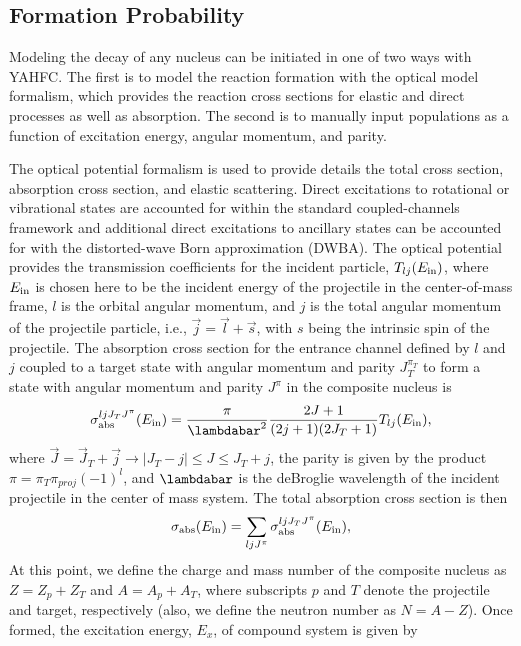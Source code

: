 \documentclass[
10pt,
showpacs,preprintnumbers,footinbib,
amsfonts,amsmath,amssymb,
aps,
prc,twocolumn,groupedaddress,superscriptaddress,
showkeys,
nofootinbib
]{revtex4-1}
\begin{document}
\subsection{Formation Probability}
Modeling the decay of any nucleus can be initiated in one of two ways with YAHFC. The first is to model the reaction formation with the optical model formalism, which provides the reaction cross sections for elastic and direct processes as well as absorption. The second is to manually input populations as a function of excitation energy, angular momentum, and parity.

The optical potential formalism is used to provide details the total cross section, absorption cross section, and elastic scattering. Direct excitations to rotational or vibrational states are accounted for within the standard coupled-channels framework and additional direct excitations to ancillary states can be accounted for with the distorted-wave Born approximation (DWBA). The optical potential provides the transmission coefficients for the incident particle, $T_{lj}(E_{\rm in})$, where $E_{\rm in}$ is chosen here to be the incident energy of the projectile in the center-of-mass frame, $l$ is the orbital angular momentum, and $j$ is the total angular momentum of the projectile particle, i.e., $\vec j = \vec l + \vec s$, with $s$ being the intrinsic spin of the projectile. The absorption cross section for the entrance channel defined by $l$ and $j$ coupled to a target state with angular momentum and parity $J_T^{\pi_T}$ to form a state with angular momentum and parity $J^\pi$ in the composite nucleus is
\begin{equation}
\sigma_{\rm abs}^{ljJ_TJ^\pi}(E_{\rm in}) = \frac{\pi}{\lambdabar^2} \frac{2J + 1}{(2j+1)(2J_T+1)}T_{lj}(E_{\rm in}),
\label{eq:abs_chan}
\end{equation}
where $\vec{J} = \vec{J}_T + \vec j \rightarrow |J_T-j| \le J \le J_T + j$, the parity is given by the product $\pi = \pi_T\pi_{proj}(-1)^l$, and $\lambdabar$ is the deBroglie wavelength of the incident projectile in the center of mass system. The total absorption cross section is then
\begin{equation} 
\sigma_{\rm abs} (E_{\rm in})= \sum_{ljJ^\pi} \sigma_{\rm abs}^{ljJ_TJ^\pi}(E_{\rm in}),
\label{eq:abs}
\end{equation}
At this point, we define the charge and mass number of the composite nucleus as $Z=Z_p+Z_T$ and $A=A_p+A_T$, where subscripts $p$ and $T$ denote the projectile and target, respectively (also, we define the neutron number as $N = A - Z$). Once formed, the excitation energy, $E_x$, of compound system is given by
\end{document}
